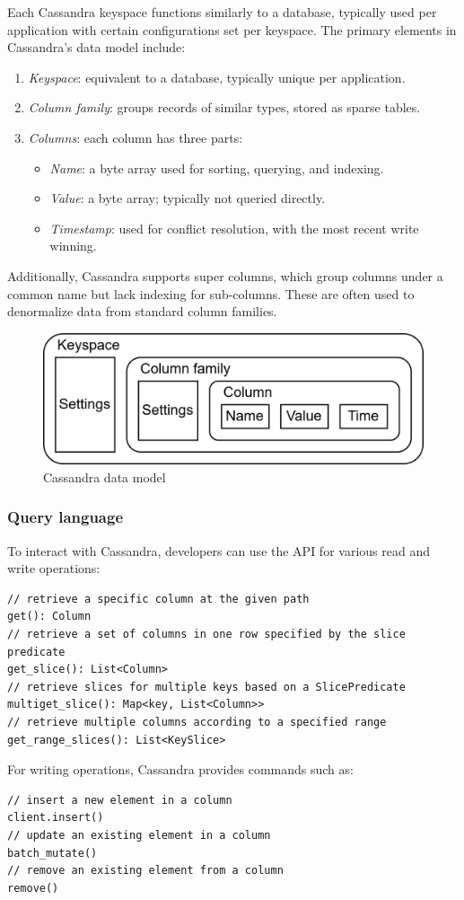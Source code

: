 Each Cassandra keyspace functions similarly to a database, typically used per application with certain configurations set per keyspace. 
The primary elements in Cassandra's data model include:
\begin{enumerate}
    \item \textit{Keyspace}: equivalent to a database, typically unique per application.
    \item \textit{Column family}: groups records of similar types, stored as sparse tables.
    \item \textit{Columns}: each column has three parts:
        \begin{itemize}
            \item \textit{Name}: a byte array used for sorting, querying, and indexing.
            \item \textit{Value}: a byte array; typically not queried directly.
            \item \textit{Timestamp}: used for conflict resolution, with the most recent write winning.
        \end{itemize}
\end{enumerate}
Additionally, Cassandra supports super columns, which group columns under a common name but lack indexing for sub-columns. These are often used to denormalize data from standard column families.
\begin{figure}[H]
    \centering
    \includegraphics[width=0.75\linewidth]{images/cas.png}
    \caption{Cassandra data model}
\end{figure}

\subsubsection{Query language}
To interact with Cassandra, developers can use the API for various read and write operations:
\begin{lstlisting}[style=Java]
// retrieve a specific column at the given path
get(): Column
// retrieve a set of columns in one row specified by the slice predicate
get_slice(): List<Column>
// retrieve slices for multiple keys based on a SlicePredicate
multiget_slice(): Map<key, List<Column>>
// retrieve multiple columns according to a specified range
get_range_slices(): List<KeySlice>
\end{lstlisting}
For writing operations, Cassandra provides commands such as:
\begin{lstlisting}[style=Java]
// insert a new element in a column
client.insert()
// update an existing element in a column
batch_mutate()
// remove an existing element from a column
remove()
\end{lstlisting}

